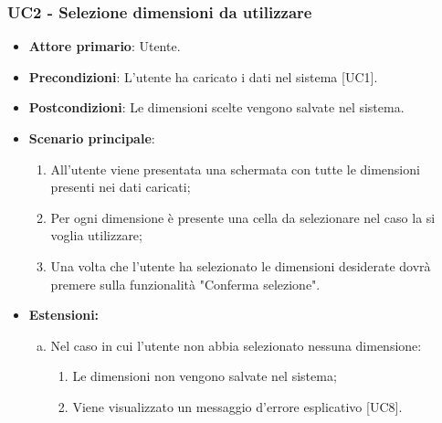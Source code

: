 \subsubsection{UC2 - Selezione dimensioni da utilizzare}
\begin{itemize}
	\item \textbf{Attore primario}: Utente.
	\item \textbf{Precondizioni}: L'utente ha caricato i dati nel sistema [UC1].
	\item \textbf{Postcondizioni}: Le dimensioni scelte vengono salvate nel sistema.
	\item \textbf{Scenario principale}:
		\begin{enumerate}
			\item All'utente viene presentata una schermata con tutte le dimensioni presenti nei dati caricati;
			\item Per ogni dimensione è presente una cella da selezionare nel caso la si voglia utilizzare;
			\item Una volta che l'utente ha selezionato le dimensioni desiderate dovrà premere sulla funzionalità "Conferma selezione".
		\end{enumerate}
	\item \textbf{Estensioni:}
		\begin{enumerate}[(a)]
			\item Nel caso in cui l'utente non abbia selezionato nessuna dimensione:
			\begin{enumerate}[1.]
				\item Le dimensioni non vengono salvate nel sistema;
				\item Viene visualizzato un messaggio d'errore esplicativo [UC8].
			\end{enumerate}
		\end{enumerate}
\end{itemize}